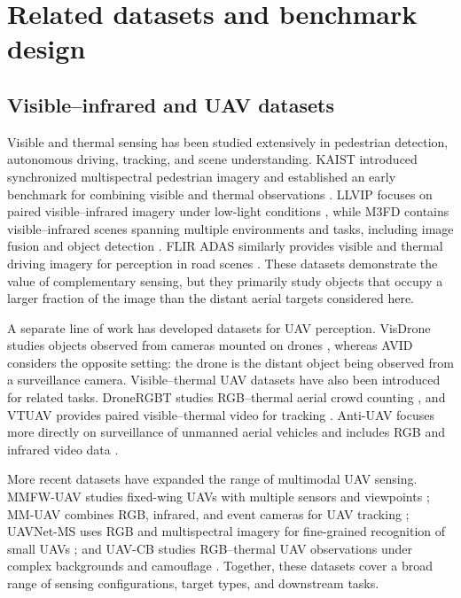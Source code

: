 \documentclass[10pt]{article}
\newcommand{\dataset}{\textsc{AVID}}
\begin{document}
\section{Related datasets and benchmark design}
\label{sec:related}

\subsection{Visible--infrared and UAV datasets}

Visible and thermal sensing has been studied extensively in pedestrian detection, autonomous driving, tracking, and scene understanding. KAIST introduced synchronized multispectral pedestrian imagery and established an early benchmark for combining visible and thermal observations \citep{hwang2015kaist}. LLVIP focuses on paired visible--infrared imagery under low-light conditions \citep{jia2021llvip}, while M3FD contains visible--infrared scenes spanning multiple environments and tasks, including image fusion and object detection \citep{liu2022tardal}. FLIR ADAS similarly provides visible and thermal driving imagery for perception in road scenes \citep{flir2018adas}. These datasets demonstrate the value of complementary sensing, but they primarily study objects that occupy a larger fraction of the image than the distant aerial targets considered here.

A separate line of work has developed datasets for UAV perception. VisDrone studies objects observed from cameras mounted on drones \citep{zhu2022visdrone}, whereas \dataset{} considers the opposite setting: the drone is the distant object being observed from a surveillance camera. Visible--thermal UAV datasets have also been introduced for related tasks. DroneRGBT studies RGB--thermal aerial crowd counting \citep{peng2020dronergbt}, and VTUAV provides paired visible--thermal video for tracking \citep{zhang2022vtuav}. Anti-UAV focuses more directly on surveillance of unmanned aerial vehicles and includes RGB and infrared video data \citep{jiang2023antiuav,antiuavrepo}.

More recent datasets have expanded the range of multimodal UAV sensing. MMFW-UAV studies fixed-wing UAVs with multiple sensors and viewpoints \citep{liu2025mmfwuav}; MM-UAV combines RGB, infrared, and event cameras for UAV tracking \citep{xu2025mmuav}; UAVNet-MS uses RGB and multispectral imagery for fine-grained recognition of small UAVs \citep{luo2026uavnetms}; and UAV-CB studies RGB--thermal UAV observations under complex backgrounds and camouflage \citep{huang2026uavcb}. Together, these datasets cover a broad range of sensing configurations, target types, and downstream tasks.
\end{document}
